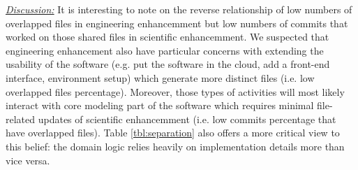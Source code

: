 \documentclass[conference,10pt]{IEEEtran}
\begin{document}
\begin{table}[!t]
\centering
\caption{Given $N$ numbers of projects, the percentage of projects having overlapping percentage above a certain threshold (25\%, 33\%, 50\%) are reported for both Scientific and Engineering development.}\label{tbl:separation}
\footnotesize
{}
\vspace{-10pt}
\end{table} 

\textit{\underline{Discussion:}}  It is interesting to note on the reverse relationship of low numbers of overlapped files in engineering enhancemment but low numbers of commits that worked on those shared files in scientific enhancemment. We suspected that engineering enhancement also have particular concerns with extending the usability of the software (e.g. put the software in the cloud, add a front-end interface, environment setup) which generate more distinct files (i.e. low overlapped files percentage). Moreover, those types of activities will most likely interact with core modeling part of the software which requires minimal file-related updates of scientific enhancemment (i.e. low commits percentage that have overlapped files). Table \ref{tbl:separation} also offers a more critical view to this belief: the domain logic relies heavily on implementation details more than vice versa.
\end{document}
